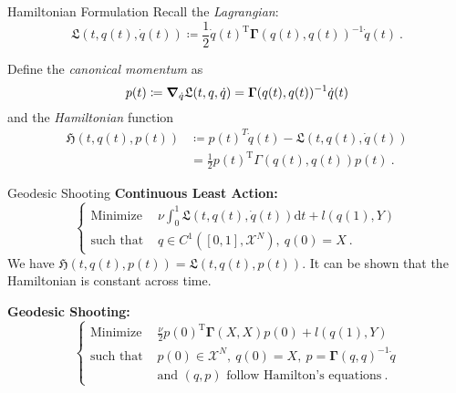 \documentclass[8pt]{beamer}
\newcommand{\cX}{\mathcal{X}}
\newcommand{\fL}{\mathfrak{L}}
\newcommand{\fH}{\mathfrak{H}}
\newcommand{\bGamma}{\mathbf{\Gamma}}
\newcommand{\T}{\mathrm{T}}
\begin{document}
	\begin{frame}{Hamiltonian Formulation}
		Recall the \emph{Lagrangian}:
		\begin{equation*}
			\fL(t, q(t), \dot{q}(t)) \coloneqq \frac{1}{2} \dot{q}(t)^\T \bGamma(q(t), q(t))^{-1} \dot{q}(t) \ .
		\end{equation*}
		
		Define the \emph{canonical momentum} as
		\begin{equation*}
			p(t) \coloneqq \grad_{\dot{q}} \fL(t, q, \dot{q}) = \bGamma(q(t), q(t))^{-1} \dot{q}(t)
		\end{equation*}
		and the \emph{Hamiltonian} function
		\begin{align*}
			\fH(t, q(t), p(t)) &\coloneqq p(t)^T\dot{q}(t) - \fL(t, q(t), \dot{q}(t))\\
			& = \frac{1}{2} p(t)^\T \Gamma(q(t), q(t)) p(t)\ .
		\end{align*}
	\end{frame}

	\begin{frame}{Geodesic Shooting}
		\textbf{Continuous Least Action:}
		\begin{equation*}
		\label{prob:cont-least-action}
			\begin{cases}
			\text{Minimize~} & \nu \int_{0}^{1} \fL(t, q(t), \dot{q}(t)) \mathrm{d}t + l(q(1), Y)\\
			\text{such that~} & q \in C^1([0,1], \cX^N),\ q(0) = X \ .
		\end{cases}
		\end{equation*}
		We have $\fH(t, q(t), p(t)) = \fL(t, q(t), p(t))$.
		It can be shown that the Hamiltonian is constant across time.
		
		\textbf{Geodesic Shooting:}
		\begin{equation*}
			\label{prob:geodesic-shooting}
			\begin{cases}
				\text{Minimize~}& \frac{\nu}{2} p(0)^\T \bGamma(X, X)p(0) + l(q(1), Y)\\
				\text{such that~} & p(0) \in \cX^N,\ q(0) = X,\ p = \bGamma(q, q)^{-1}\dot{q}\\
				&\text{and~} (q,p) \text{~follow Hamilton's equations} \ .
			\end{cases}
		\end{equation*}
	\end{frame}
\end{document}
